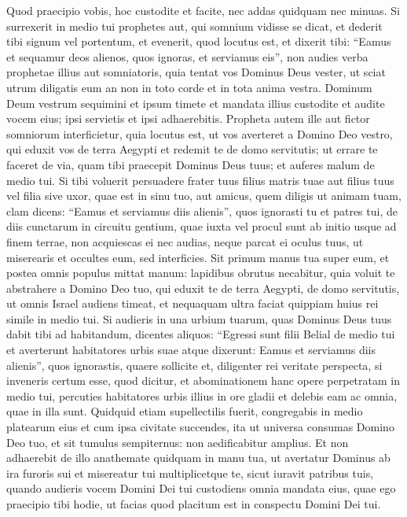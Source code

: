\begin{biblechapter} 
\verse Quod praecipio vobis, hoc custodite et facite, nec addas quidquam nec minuas. 
\verse Si surrexerit in medio tui prophetes aut, qui somnium vidisse se dicat, et dederit tibi signum vel portentum, 
\verse et evenerit, quod locutus est, et dixerit tibi: “Eamus et sequamur deos alienos, quos ignoras, et serviamus eis”, 
\verse non audies verba prophetae illius aut somniatoris, quia tentat vos Dominus Deus vester, ut sciat utrum diligatis eum an non in toto corde et in tota anima vestra. 
\verse Dominum Deum vestrum sequimini et ipsum timete et mandata illius custodite et audite vocem eius; ipsi servietis et ipsi adhaerebitis. 
\verse Propheta autem ille aut fictor somniorum interficietur, quia locutus est, ut vos averteret a Domino Deo vestro, qui eduxit vos de terra Aegypti et redemit te de domo servitutis; ut errare te faceret de via, quam tibi praecepit Dominus Deus tuus; et auferes malum de medio tui. 
\verse Si tibi voluerit persuadere frater tuus filius matris tuae aut filius tuus vel filia sive uxor, quae est in sinu tuo, aut amicus, quem diligis ut animam tuam, clam dicens: “Eamus et serviamus diis alienis”, quos ignorasti tu et patres tui,  
\verse de diis cunctarum in circuitu gentium, quae iuxta vel procul sunt ab initio usque ad finem terrae, 
\verse non acquiescas ei nec audias, neque parcat ei oculus tuus, ut miserearis et occultes eum, 
\verse sed interficies. Sit primum manus tua super eum, et postea omnis populus mittat manum: 
\verse lapidibus obrutus necabitur, quia voluit te abstrahere a Domino Deo tuo, qui eduxit te de terra Aegypti, de domo servitutis, 
\verse ut omnis Israel audiens timeat, et nequaquam ultra faciat quippiam huius rei simile in medio tui. 
\verse Si audieris in una urbium tuarum, quas Dominus Deus tuus dabit tibi ad habitandum, dicentes aliquos: 
\verse “Egressi sunt filii Belial de medio tui et averterunt habitatores urbis suae atque dixerunt: Eamus et serviamus diis alienis”, quos ignorastis, 
\verse quaere sollicite et, diligenter rei veritate perspecta, si inveneris certum esse, quod dicitur, et abominationem hanc opere perpetratam in medio tui, 
\verse percuties habitatores urbis illius in ore gladii et delebis eam ac omnia, quae in illa sunt. 
\verse Quidquid etiam supellectilis fuerit, congregabis in medio platearum eius et cum ipsa civitate succendes, ita ut universa consumas Domino Deo tuo, et sit tumulus sempiternus: non aedificabitur amplius. 
\verse Et non adhaerebit de illo anathemate quidquam in manu tua, ut avertatur Dominus ab ira furoris sui et misereatur tui multiplicetque te, sicut iuravit patribus tuis, 
\verse quando audieris vocem Domini Dei tui custodiens omnia mandata eius, quae ego praecipio tibi hodie, ut facias quod placitum est in conspectu Domini Dei tui. 
\end{biblechapter}


